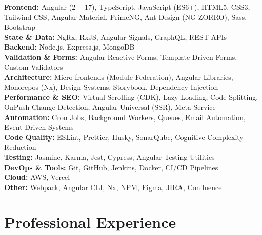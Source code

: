 \documentclass[11pt,a4paper]{article}
\begin{document}
\textbf{Frontend:} Angular (2+--17), TypeScript, JavaScript (ES6+), HTML5, CSS3, Tailwind CSS, Angular Material, PrimeNG, Ant Design (NG-ZORRO), Sass, Bootstrap \\
\textbf{State \& Data:} NgRx, RxJS, Angular Signals, GraphQL, REST APIs \\
\textbf{Backend:} Node.js, Express.js, MongoDB \\
\textbf{Validation \& Forms:} Angular Reactive Forms, Template-Driven Forms, Custom Validators \\
\textbf{Architecture:} Micro-frontends (Module Federation), Angular Libraries, Monorepos (Nx), Design Systems, Storybook, Dependency Injection \\
\textbf{Performance \& SEO:} Virtual Scrolling (CDK), Lazy Loading, Code Splitting, OnPush Change Detection, Angular Universal (SSR), Meta Service \\
\textbf{Automation:} Cron Jobs, Background Workers, Queues, Email Automation, Event-Driven Systems \\
\textbf{Code Quality:} ESLint, Prettier, Husky, SonarQube, Cognitive Complexity Reduction \\
\textbf{Testing:} Jasmine, Karma, Jest, Cypress, Angular Testing Utilities \\
\textbf{DevOps \& Tools:} Git, GitHub, Jenkins, Docker, CI/CD Pipelines \\
\textbf{Cloud:} AWS, Vercel \\
\textbf{Other:} Webpack, Angular CLI, Nx, NPM, Figma, JIRA, Confluence

\section*{Professional Experience}
\end{document}
